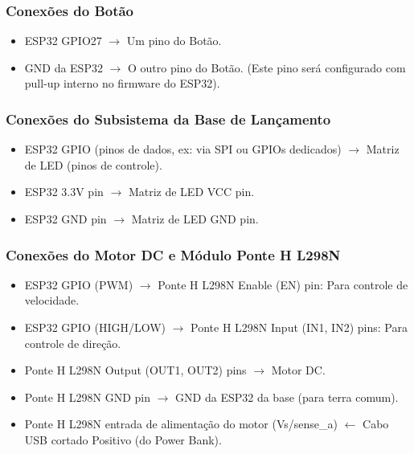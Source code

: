 \subsubsection{Conexões do Botão}

\begin{itemize}
    \item ESP32 GPIO27 $\rightarrow$ Um pino do Botão.
    \item GND da ESP32 $\rightarrow$ O outro pino do Botão. (Este pino será configurado com pull-up interno no firmware do ESP32).
\end{itemize}

\subsubsection{Conexões do Subsistema da Base de Lançamento}

\begin{itemize}
    \item ESP32 GPIO (pinos de dados, ex: via SPI ou GPIOs dedicados) $\rightarrow$ Matriz de LED (pinos de controle).
    \item ESP32 3.3V pin $\rightarrow$ Matriz de LED VCC pin.
    \item ESP32 GND pin $\rightarrow$ Matriz de LED GND pin.
\end{itemize}

\subsubsection{Conexões do Motor DC e Módulo Ponte H L298N}

\begin{itemize}
    \item ESP32 GPIO (PWM) $\rightarrow$ Ponte H L298N Enable (EN) pin: Para controle de velocidade.
    \item ESP32 GPIO (HIGH/LOW) $\rightarrow$ Ponte H L298N Input (IN1, IN2) pins: Para controle de direção.
    \item Ponte H L298N Output (OUT1, OUT2) pins $\rightarrow$ Motor DC.
    \item Ponte H L298N GND pin $\rightarrow$ GND da ESP32 da base (para terra comum).
    \item Ponte H L298N entrada de alimentação do motor (Vs/sense\_a) $\leftarrow$ Cabo USB cortado Positivo (do Power Bank).
\end{itemize}


